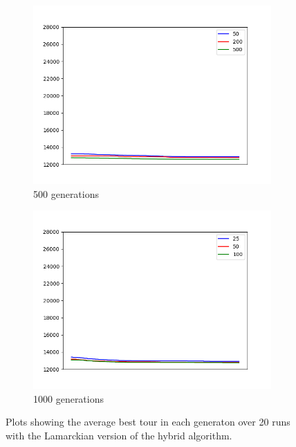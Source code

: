 \documentclass[a4paper]{article}
\begin{document}
\begin{figure}[h]
  \centering
  \begin{subfigure}[b]{0.48\textwidth}
    \includegraphics[width=\textwidth]{run_hybrid_lamarckian_20_runs_500_gens.png}
    \caption{500 generations}
  \end{subfigure}
  \hfill
  \begin{subfigure}[b]{0.48\textwidth}
    \includegraphics[width=\textwidth]{run_hybrid_lamarckian_20_runs_1000_gens.png}
    \caption{1000 generations}
  \end{subfigure}
  \caption{Plots showing the average best tour in each generaton over 20 runs
    with the Lamarckian version of the hybrid algorithm.}
  \label{fig:hl}
\end{figure}
\end{document}

